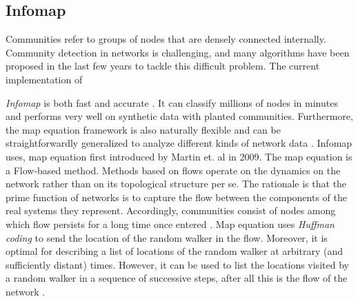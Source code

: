 \subsection{Infomap}\label{subsec:infomap}
Communities refer to groups of nodes that are densely connected internally. Community detection in networks is challenging, and many algorithms have been proposed in the last few years to tackle this difficult problem. The current implementation of {\textit{Infomap} is both fast and accurate \cite{ref-42}. It can classify millions of nodes in minutes and performs very well on synthetic data with planted communities. Furthermore, the map equation framework is also naturally flexible and can be straightforwardly generalized to analyze different kinds of network data \cite{ref-42}. Infomap uses, map equation \cite{ref-43} first introduced by Martin et. al in 2009. The map equation is a Flow-based method. Methods based on flows operate on the dynamics on the network rather than on its topological structure per se. The rationale is that the prime function of networks is to capture the flow between the components of the real systems they represent. Accordingly, communities consist of nodes among which flow persists for a long time once entered \cite{ref-42}. Map equation uses \textit{Huffman coding} \cite{ref-44} to send the location of the random walker \cite{ref-57} in the flow. Moreover, it is optimal for describing a list of locations of the random walker at arbitrary (and sufficiently distant) times. However, it can be used to list the locations visited by a random walker in a sequence of successive steps, after all this is the flow of the network \cite{ref-43}. 

}
